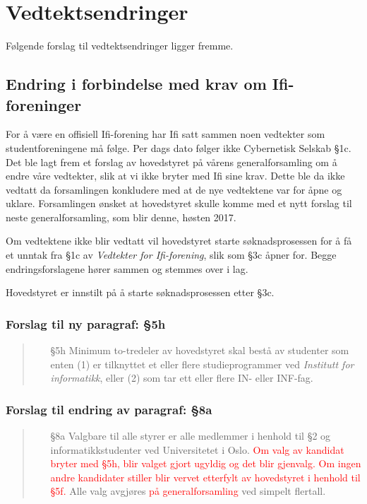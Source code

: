 \documentclass[10pt,norsk,a4paper]{article}
\begin{document}
\newpage

\section{Vedtektsendringer}
Følgende forslag til vedtektsendringer ligger fremme.

\subsection{Endring i forbindelse med krav om Ifi-foreninger}

For å være en offisiell Ifi-forening har Ifi satt sammen noen vedtekter som studentforeningene må følge.
Per dags dato følger ikke Cybernetisk Selskab §1c\footnotemark. Det ble lagt frem et forslag av hovedstyret på vårens generalforsamling om å endre våre vedtekter, slik at vi ikke bryter med Ifi sine krav.
Dette ble da ikke vedtatt da forsamlingen konkludere med at de nye vedtektene var for åpne og uklare. Forsamlingen ønsket at hovedstyret skulle komme med et nytt forslag til neste generalforsamling, som blir denne, høsten 2017.


Om vedtektene ikke blir vedtatt vil hovedstyret starte søknadsprosessen for å få et unntak fra §1c av \textit{Vedtekter for Ifi-forening}, slik som §3c åpner for. Begge endringsforslagene hører sammen og stemmes over i lag.

Hovedstyret er innstilt på å starte søknadsprosessen etter §3c.

\subsubsection{Forslag til ny paragraf: §5h}
\begin{quote}
	\begin{enumerate}
		\item[§5h] Minimum to-tredeler av hovedstyret skal bestå av studenter som enten (1) er tilknyttet et eller flere studieprogrammer ved \textit{Institutt for informatikk}, eller (2) som tar ett eller flere IN- eller INF-fag.
	\end{enumerate}
\end{quote}

\subsubsection{Forslag til endring av paragraf: §8a}
\begin{quote}
	\begin{enumerate}
		\item[§8a]
			Valgbare til alle styrer er alle medlemmer i henhold til §2 og informatikkstudenter ved Universitetet i Oslo. \textcolor{red}{Om valg av kandidat bryter med §5h, blir valget gjort ugyldig og det blir gjenvalg. Om ingen andre kandidater stiller blir vervet etterfylt av hovedstyret i henhold til §5f.} Alle valg avgjøres \textcolor{red}{på generalforsamling} ved simpelt flertall.
	\end{enumerate}
\end{quote}
\end{document}
